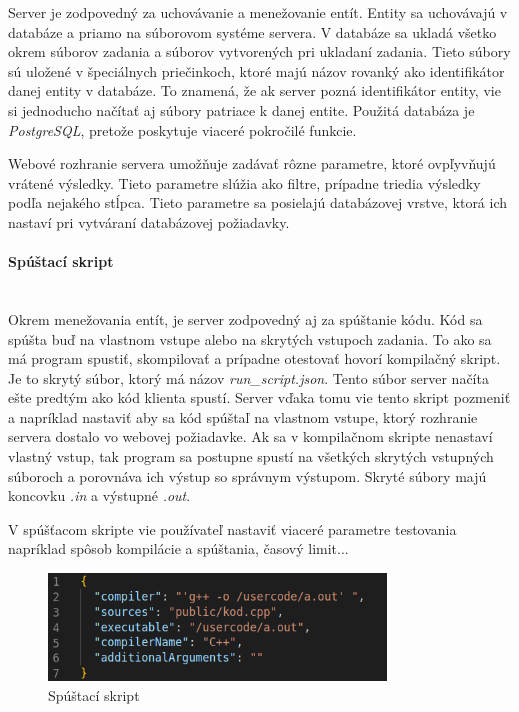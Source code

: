 Server je zodpovedný za uchovávanie a menežovanie entít. Entity sa uchovávajú v
databáze a priamo na súborovom systéme servera. V databáze sa ukladá všetko okrem súborov
zadania a súborov vytvorených pri ukladaní zadania. Tieto súbory sú uložené v špeciálnych
priečinkoch, ktoré majú názov rovanký ako identifikátor danej entity v databáze. To znamená, že
ak server pozná identifikátor entity, vie si jednoducho načítať aj súbory patriace k danej entite.
Použitá databáza je \textit{PostgreSQL}, pretože poskytuje viaceré pokročilé funkcie.

Webové rozhranie servera umožňuje zadávať rôzne parametre, ktoré ovpľyvňujú vrátené výsledky. Tieto
parametre slúžia ako filtre, prípadne triedia výsledky podľa nejakého stĺpca. Tieto parametre sa
posielajú databázovej vrstve, ktorá ich nastaví pri vytváraní databázovej požiadavky.

\paragraph{Spúštací skript}\leavevmode\\
Okrem menežovania entít, je server zodpovedný aj za spúštanie kódu. Kód sa spúšta buď na vlastnom
vstupe alebo na skrytých vstupoch zadania. To ako sa má program spustiť, skompilovať a prípadne
otestovať hovorí kompilačný skript. Je to skrytý súbor, ktorý má názov
\textit{run\_script.json}. Tento súbor server načíta ešte predtým ako kód klienta spustí. Server
vďaka tomu vie tento skript pozmeniť a napríklad nastaviť aby sa kód spúštaľ na vlastnom vstupe,
ktorý rozhranie servera dostalo vo webovej požiadavke. Ak sa v kompilačnom skripte nenastaví
vlastný vstup, tak program sa postupne spustí na všetkých skrytých vstupných súboroch a porovnáva
ich výstup so správnym výstupom. Skryté súbory majú koncovku \textit{.in} a výstupné \textit{.out}.

V spúšťacom skripte vie používateľ nastaviť viaceré parametre testovania napríklad spôsob
kompilácie a spúštania, časový limit...
\begin{figure}[H]
\centerline{\includegraphics[width=0.8\textwidth]{images/spustaci_skript}}
\caption[Spúštací skript]{Spúštací skript}
\label{obr:zadania}
\end{figure}

